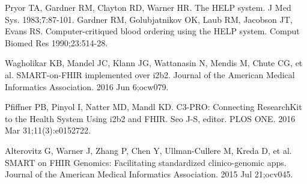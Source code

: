 \documentclass{amia}
\begin{document}
%
%


\makeatletter
\renewcommand{\@biblabel}[1]{\hfill #1.}
\makeatother




\begin{thebibliography}{1}
\setlength\itemsep{-0.1em}

Pryor TA, Gardner RM, Clayton RD, Warner HR. The HELP system. J Med Sys. 1983;7:87-101.
Gardner RM, Golubjatnikov OK, Laub RM, Jacobson JT, Evans RS. Computer-critiqued blood ordering using the HELP system. Comput Biomed Res 1990;23:514-28.

Wagholikar KB, Mandel JC, Klann JG, Wattanasin N, Mendis M, Chute CG, et al. SMART-on-FHIR implemented over i2b2. Journal of the American Medical Informatics Association. 2016 Jun 6;ocw079. 

Pfiffner PB, Pinyol I, Natter MD, Mandl KD. C3-PRO: Connecting ResearchKit to the Health System Using i2b2 and FHIR. Seo J-S, editor. PLOS ONE. 2016 Mar 31;11(3):e0152722. 

Alterovitz G, Warner J, Zhang P, Chen Y, Ullman-Cullere M, Kreda D, et al. SMART on FHIR Genomics: Facilitating standardized clinico-genomic apps. Journal of the American Medical Informatics Association. 2015 Jul 21;ocv045. 

\end{thebibliography}
\end{document}
